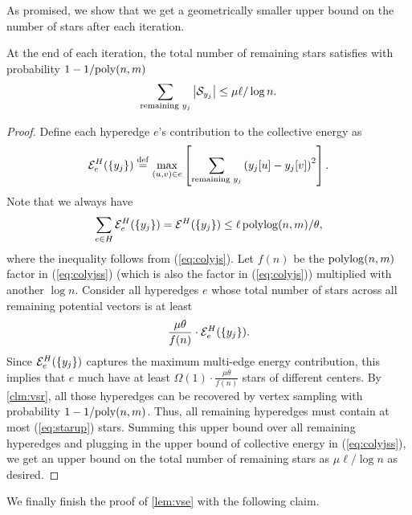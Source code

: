 \documentclass{article}
\begin{document}
As promised, we show that
we get a geometrically smaller upper bound on the number of stars
after each iteration.
\begin{claim}\label{clm:starred}
At the end of each iteration, the total number of remaining stars satisfies
with probability $1-1/\mathrm{poly}(n,m)$
\begin{align*}
    \sum_{\text{remaining $y_j$}} \left|\mathcal{S}_{y_j} \right| \leq
    \mu \ell / \log n.
\end{align*}
\end{claim}
\begin{proof}
Define each hyperedge $e$'s contribution to the collective energy as
\begin{align*}
    \mathcal{E}^H_e(\left\{y_j \right\}) \stackrel{\mathrm{def}}{=}
    \max_{(u,v)\in e}
    \left[ \sum_{\text{remaining $y_j$}} \left(y_j[u] - y_j[v]\right)^2 \right].
\end{align*}
Note that we always have
\begin{align}
\sum_{e\in H} \mathcal{E}^H_e(\left\{y_j \right\}) =
\mathcal{E}^H(\left\{y_j \right\}) \leq \ell \operatorname{polylog}(n,m) / \theta,
\label{eq:colyjss}
\end{align}
where the inequality follows from (\ref{eq:colyjs}).
    Let $f(n)$ be the $\operatorname{polylog}(n,m)$ factor in (\ref{eq:colyjss}) (which is also
    the factor in (\ref{eq:colyjs})) multiplied with
    another $\log n$.
    Consider all hyperedges $e$ whose total number of stars across all remaining
    potential vectors is at least
    \begin{align}\label{eq:starup}
        \frac{\mu\theta}{f(n)}\cdot \mathcal{E}^H_e(\left\{y_j \right\}).
    \end{align}
    Since $\mathcal{E}^H_e(\left\{y_j \right\})$ captures the maximum multi-edge energy contribution,
    this implies that $e$ much have at least $\Omega(1)\cdot \frac{\mu\theta}{f(n)}$
    stars of different centers.
    By \cref{clm:vsr}, all those hyperedges can be recovered by vertex sampling
    with probability $1-1/\mathrm{poly}(n,m)$.
    Thus, all remaining hyperedges must contain at most (\ref{eq:starup}) stars.
    Summing this upper bound over all remaining hyperedges and plugging
    in the upper bound of collective energy in (\ref{eq:colyjss}), we get
    an upper bound on the total number of remaining stars as
    $\mu\ell / \log n$ as desired.
\end{proof}

We finally finish the proof of \cref{lem:vse} with the following claim.
\end{document}
